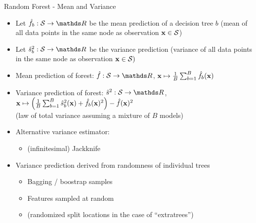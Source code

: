 \documentclass[11pt,compress,t,notes=noshow, xcolor=table]{beamer}
\begin{document}
\begin{frame}{Random Forest - Mean and Variance}

\begin{itemize}
    \item Let $\fh_b: \mathcal{S} \to \R$ be the mean prediction of a decision tree $b$ (mean of all data points in the same node as observation $\mathbf{x} \in \mathcal{S}$)
    \item Let $\sh_{b}^2: \mathcal{S} \to \R$ be the variance prediction (variance of all data points in the same node as observation $\mathbf{x} \in \mathcal{S})$
    \item Mean prediction of forest: $\fh: \mathcal{S} \to \R$,
    $\mathbf{x} \mapsto \frac{1}{B} \sum_{b = 1}^{B} \hat{f}_{b}(\mathbf{x})$
    \item Variance prediction of forest: $\sh^{2}: \mathcal{S} \to \R$,\\
    $\mathbf{x} \mapsto  \left( \frac{1}{B} \sum_{b = 1}^{B} \hat{s}_{b}^2(\mathbf{x}) + \hat{f}_{b}(\mathbf{x})^{2} \right) - \hat{f}(\mathbf{x})^{2}$\\
    (law of total variance assuming a mixture of $B$ models)
    \item Alternative variance estimator:
    \begin{itemize}
        \item (infinitesimal) Jackknife
    \end{itemize}
    \item Variance prediction derived from randomness of individual trees
    \begin{itemize}
    \item Bagging / boostrap samples
    \item Features sampled at random
    \item (randomized split locations in the case of \enquote{extratrees})
    \end{itemize}
\end{itemize}

\end{frame}
\end{document}
